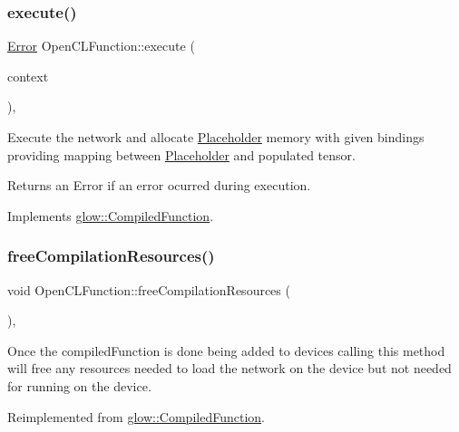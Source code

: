 \subsubsection{\texorpdfstring{execute()}{execute()}}
{\footnotesize\ttfamily \hyperlink{namespaceglow_afdb176c3a672ef66db0ecfc19a8d39bf}{Error} Open\+C\+L\+Function\+::execute (\begin{DoxyParamCaption}\item[{\hyperlink{classglow_1_1_execution_context}{Execution\+Context} $\ast$}]{context }\end{DoxyParamCaption})\hspace{0.3cm}{\ttfamily [override]}, {\ttfamily [virtual]}}

Execute the network and allocate \hyperlink{classglow_1_1_placeholder}{Placeholder} memory with given {\ttfamily bindings} providing mapping between \hyperlink{classglow_1_1_placeholder}{Placeholder} and populated tensor. \begin{DoxyReturn}{Returns}
an Error if an error ocurred during execution. 
\end{DoxyReturn}


Implements \hyperlink{classglow_1_1_compiled_function_ac8dd94f2ee7129a435f1701b6a9f419e}{glow\+::\+Compiled\+Function}.

\mbox{\label{classglow_1_1_open_c_l_function_aeaa9afb43d01cedc7c89c7451e5cec5d}} 
\subsubsection{\texorpdfstring{free\+Compilation\+Resources()}{freeCompilationResources()}}
{\footnotesize\ttfamily void Open\+C\+L\+Function\+::free\+Compilation\+Resources (\begin{DoxyParamCaption}{ }\end{DoxyParamCaption})\hspace{0.3cm}{\ttfamily [override]}, {\ttfamily [virtual]}}

Once the compiled\+Function is done being added to devices calling this method will free any resources needed to load the network on the device but not needed for running on the device. 

Reimplemented from \hyperlink{classglow_1_1_compiled_function_a0bd30fa8ff4f317ac14ae1c02898ed1a}{glow\+::\+Compiled\+Function}.


